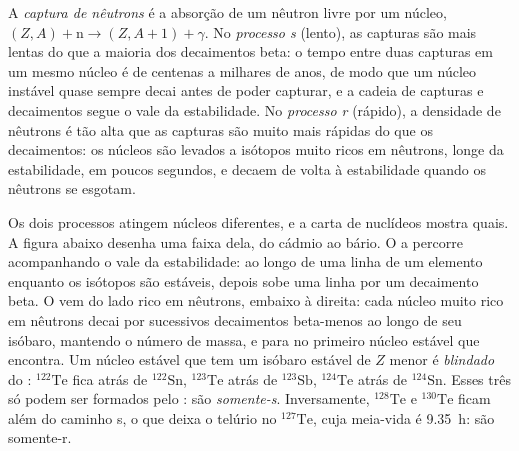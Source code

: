 \begin{definition}\label{def:b3:origin-of-elements:s-process}
A \emph{captura de nêutrons} é a absorção de um
nêutron livre por um núcleo, $(Z, A) + \mathrm{n} \to (Z, A+1) + \gamma$.
No \emph{processo s} (lento), as capturas
são mais lentas do que a maioria dos decaimentos beta: o tempo entre duas capturas em um
mesmo núcleo é de centenas a milhares de anos, de modo que um núcleo instável
quase sempre decai antes de poder capturar, e a cadeia de capturas
e decaimentos segue o vale da estabilidade. No
\emph{processo r} (rápido), a densidade de nêutrons
é tão alta que as capturas são muito mais rápidas do que os decaimentos: os núcleos são
levados a isótopos muito ricos em nêutrons, longe da estabilidade, em poucos
segundos, e decaem de volta à estabilidade quando os nêutrons se esgotam.
\end{definition}

Os dois processos atingem núcleos diferentes, e a carta de nuclídeos
mostra quais. A figura abaixo desenha uma faixa dela, do cádmio ao
bário. O  a percorre acompanhando o vale da estabilidade: ao longo
de uma linha de um elemento enquanto os isótopos são estáveis, depois sobe uma linha por um
decaimento beta. O  vem do lado rico em nêutrons, embaixo
à direita: cada núcleo muito rico em nêutrons decai por sucessivos decaimentos beta-menos
ao longo de seu isóbaro, mantendo o número de massa, e para no primeiro
núcleo estável que encontra. Um núcleo estável que tem um isóbaro estável de
$Z$ menor é \emph{blindado} do : $^{122}\mathrm{Te}$
fica atrás de $^{122}\mathrm{Sn}$, $^{123}\mathrm{Te}$ atrás de
$^{123}\mathrm{Sb}$, $^{124}\mathrm{Te}$ atrás de $^{124}\mathrm{Sn}$.
Esses três só podem ser formados pelo : são
\emph{somente-s}. Inversamente, $^{128}\mathrm{Te}$ e $^{130}\mathrm{Te}$
ficam além do caminho s, o que deixa o telúrio no $^{127}\mathrm{Te}$,
cuja meia-vida é \qty{9.35}{h}: são somente-r.

